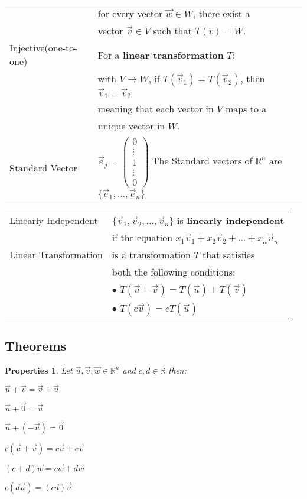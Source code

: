 \documentclass[5pt]{article}
\begin{document}
\begin{multicols}{2}
\begin{tabular}{ll}
                            & for every vector $\vec{w}\in W$, there exist a\\
                            & vector $\vec{v}\in V$ such that $T(v)=W$.\\
\small{Injective}\footnotesize{(one-to-one)}                   & For a \textbf{linear transformation} $T$:\\
                            & with $V\rightarrow W$, if $T(\vec{v}_1)=T(\vec{v}_2)$, then $\vec{v}_1=\vec{v}_2$\\
                            & meaning that each vector in $V$ maps to a\\
                            & unique vector in $W$.\\
Standard Vector             & $\vec{e}_j=$\footnotesize{$\begin{pmatrix}0\\ \vdots\\ 1\\ \vdots\\ 0\end{pmatrix}$} \footnotesize{The Standard vectors of $\mathbb{R}^n$ are $\{\vec{e}_1, ..., \vec{e}_n\}$}\\
\end{tabular}
\begin{tabular}{ll}
Linearly Independent  & $\{\vec{v}_1, \vec{v}_2, ..., \vec{v}_n\}$ is \textbf{linearly independent}\\
                      & if the equation $x_1\vec{v}_1 + x_2\vec{v}_2 + ... + x_n\vec{v}_n$\\
Linear Transformation & is a transformation $T$ that satisfies\\
                      & both the following conditions:\\
                      & $\bullet$ $T(\vec{u}+\vec{v}) = T(\vec{u}) + T(\vec{v})$\\
                      & $\bullet$ $T(c\vec{u})=cT(\vec{u})$\\
\end{tabular}

\subsection{Theorems}
\newtheorem{theorem}{Theorem}
\newtheorem{properties}{Properties}

\begin{properties}
  Let $\vec{u},\vec{v}, \vec{w}\in \mathbb{R}^n$ and $c,d\in\mathbb{R}$ then:
  \begin{itemize*}
    \item $\vec{u}+\vec{v}=\vec{v}+\vec{u}$
    \item $\vec{u}+\vec{0}=\vec{u}$
    \item $\vec{u}+(-\vec{u})=\vec{0}$
    \item $c(\vec{u}+\vec{v})=c\vec{u}+c\vec{v}$
    \item $(c+d)\vec{w}=c\vec{w}+d\vec{w}$
    \item $c(d\vec{u})=(cd)\vec{u}$
  \end{itemize*}
\end{properties}


\end{multicols}
\end{document}
